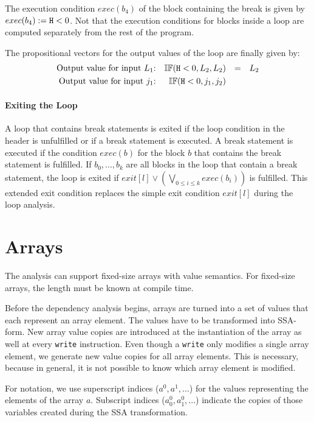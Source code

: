 The execution condition $exec(b_4)$ of the block containing the break is given by $exec(b_4) := \mathtt{H} < 0$. Not that the execution conditions for blocks inside a loop are computed separately from the rest of the program.

The propositional vectors for the output values of the loop are finally given by:
\begin{align*}
    \text{Output value for input $L_1$:} && \mathbb{IF}(\mathtt{H} < 0 , L_2 , L_2) && = && L_2 \\
    \text{Output value for input $j_1$:} && \mathbb{IF}(\mathtt{H} < 0 , j_1, j_2)\\
\end{align*}

\paragraph{Exiting the Loop}
A loop that contains break statements is exited if the loop condition in the header is unfulfilled or if a break statement is executed. A break statement is executed if the condition $exec(b)$ for the block $b$ that contains the break statement is fulfilled. If $b_0, ..., b_k$ are all blocks in the loop that contain a break statement, the loop is exited if $exit[l] \lor \left(\bigvee\limits_{0 \leq i \leq k} exec(b_i)\right)$ is fulfilled. This extended exit condition replaces the simple exit condition $exit[l]$ during the loop analysis.

\section{Arrays}
The analysis can support fixed-size arrays with value semantics. For fixed-size arrays, the length must be known at compile time.

Before the dependency analysis begins, arrays are turned into a set of values that each represent an array element. The values have to be transformed into SSA-form. New array value copies are introduced at the instantiation of the array as well at every \texttt{write} instruction. Even though a \texttt{write} only modifies a single array element, we generate new value copies for all array elements. This is necessary, because in general, it is not possible to know which array element is modified.

For notation, we use superscript indices ($a^0, a^1, ...$) for the values representing the elements of the array $a$. Subscript indices ($a^0_0, a^0_1,...$) indicate the copies of those variables created during the SSA transformation.

